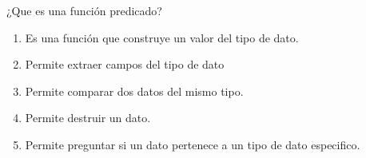 {
  ¿Que es una función predicado?
\begin{enumerate}
  \item Es una función que construye un valor del tipo de dato.
  \item Permite extraer campos del tipo de dato
  \item Permite comparar dos datos del mismo tipo.
  \item Permite destruir un dato.
  \item Permite preguntar si un dato pertenece a un tipo de dato especifico. %
\end{enumerate}
}
